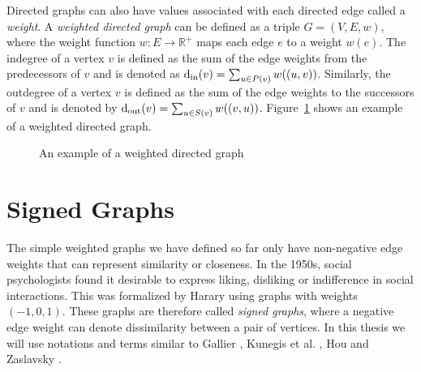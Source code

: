 Directed graphs can also have values associated with each directed edge called a \textit{weight}. A \textit{weighted directed graph} can be defined as a triple $G=(V,E,w)$, where the weight function $w:E \rightarrow \mathbb{R}^{+}$ maps each edge $e$ to a weight $w(e)$. The indegree of a vertex $v$ is defined as the sum of the edge weights from the predecessors of $v$ and is denoted as $\operatorname*{d_{\text{in}}}(v) = \sum_{u \in P(v)} w((u,v))$. Similarly, the outdegree of a vertex $v$ is defined as the sum of the edge weights to the successors of $v$ and is denoted by $\operatorname*{d_{\text{out}}}(v) = \sum_{u \in S(v)}w((v,u))$.
Figure~\ref{fig:weighted-directed} shows an example of a weighted directed graph.

\begin{figure}[!ht]
    \centering
    
    \caption{An example of a weighted directed graph}
    \label{fig:weighted-directed}
\end{figure}

\section{Signed Graphs}
\label{sec:signed-graphs}
The simple weighted graphs we have defined so far only have non-negative edge weights that can represent similarity or closeness. In the 1950s, social psychologists found it desirable to express liking, disliking or indifference in social interactions. This was formalized by Harary \cite{harary1953on} using graphs with weights $(-1,0,1)$. These graphs are therefore called \textit{signed graphs}, where a negative edge weight can denote dissimilarity between a pair of vertices. In this thesis we will use notations and terms similar to Gallier \cite{gallier2016spectral}, Kunegis et al. \cite{kunegis2010spectral}, Hou \cite{hou2005bounds} and Zaslavsky \cite{zaslavsky1982signed}.

